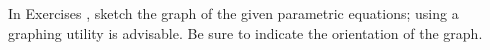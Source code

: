 {\noindent In Exercises}
{, sketch the graph of the given parametric equations; using a graphing utility is advisable. Be sure to indicate the orientation of the graph.
}
